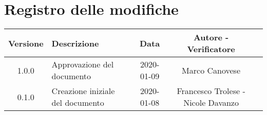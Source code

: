 \section*{Registro delle modifiche}

\begin{center}
	\begin{longtable}{|c|p{5cm}|c|c|c|}
	\hline
	\rowcolor{lighter-grayer}
	\textbf{Versione} & \textbf{Descrizione} & \textbf{Data} & \textbf{Autore - Verificatore} \\
	\hline
	\endfirsthead


	\hline
	1.0.0 & Approvazione del documento & 2020-01-09 & Marco Canovese\\
	0.1.0 & Creazione iniziale del documento & 2020-01-08 & Francesco Trolese - Nicole Davanzo \\

	\hline

	\end{longtable}
\end{center}